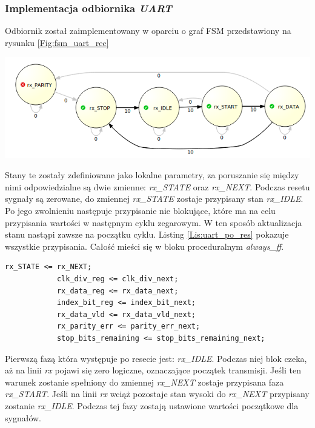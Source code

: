 \documentclass[11pt,a4paper]{article}
\begin{document}
	\subsubsection{Implementacja odbiornika \textit{UART}}
	Odbiornik został zaimplementowany w oparciu o graf FSM przedstawiony na rysunku \ref{Fig:fsm_uart_rec} \\
			\begin{minipage}[c]{\textwidth}
					\includegraphics[width=\textwidth]{./rysunki/uart_fsm_rec.png}
			\end{minipage} 
			Stany te zostały zdefiniowane jako lokalne parametry, za poruszanie się między nimi odpowiedzialne są dwie zmienne: \textit{rx\_STATE} oraz \textit{rx\_NEXT}. Podczas resetu sygnały są zerowane, do zmiennej \textit{rx\_STATE} zostaje przypisany stan \textit{rx\_IDLE}. Po jego zwolnieniu następuje przypisanie nie blokujące, które ma na celu przypisania wartości w następnym cyklu zegarowym. W ten sposób aktualizacja stanu nastąpi zawsze na początku cyklu. Listing \ref{Lis:uart_po_res} pokazuje wszystkie przypisania. Całość mieści się w bloku proceduralnym \textit{always\_ff}.\\
\begin{minipage}{\textwidth}
\begin{scriptsize}
\begin{lstlisting}[label=Lis:uart_po_res,caption=Odbiornik \textit{UART} po resecie]
			rx_STATE <= rx_NEXT;
			clk_div_reg <= clk_div_next;
			rx_data_reg <= rx_data_next;
			index_bit_reg <= index_bit_next;
			rx_data_vld <= rx_data_vld_next;
			rx_parity_err <= parity_err_next;
			stop_bits_remaining <= stop_bits_remaining_next;
\end{lstlisting}
\end{scriptsize}
\end{minipage}	
Pierwszą fazą która występuje po resecie jest: \textit{rx\_IDLE}. Podczas niej blok czeka, aż na linii \textit{rx} pojawi się zero logiczne, oznaczające początek transmisji. Jeśli ten warunek zostanie spełniony do zmiennej \textit{rx\_NEXT} zostaje przypisana faza \textit{rx\_START}. Jeśli na linii \textit{rx} wciąż pozostaje stan wysoki do \textit{rx\_NEXT} przypisany zostanie \textit{rx\_IDLE}. Podczas tej fazy zostają ustawione wartości początkowe dla sygnałów.\\
\end{document}
